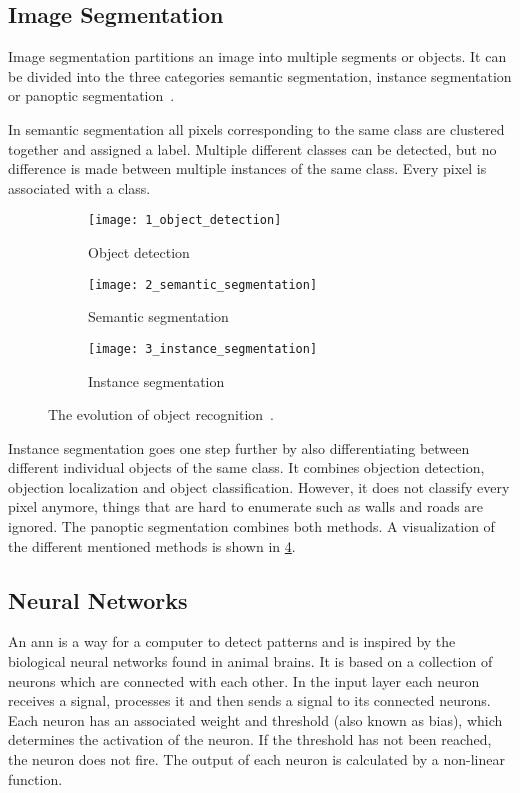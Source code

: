 \subsection{Image Segmentation}
Image segmentation partitions an image into multiple segments or objects.
It can be divided into the three categories semantic segmentation, instance segmentation or panoptic segmentation~\cite{Minaee2021}.\par
In semantic segmentation all pixels corresponding to the same class are clustered together and assigned a label.
Multiple different classes can be detected, but no difference is made between multiple instances of the same class.
Every pixel is associated with a class.\par
\begin{figure}[htb]
    \centering
    \begin{subfigure}{0.3\textwidth}
        \centering
        \texttt{[image: 1\_object\_detection]}
        \caption{Object detection}
        \label{fig:object_detection}
    \end{subfigure}
    \begin{subfigure}{0.3\textwidth}
        \centering
        \texttt{[image: 2\_semantic\_segmentation]}
        \caption{Semantic segmentation}
        \label{fig:semantic_segmentation}
    \end{subfigure}
    \begin{subfigure}{0.3\textwidth}
        \centering
        \texttt{[image: 3\_instance\_segmentation]}
        \caption{Instance segmentation}
        \label{fig:instance_segmentation}
    \end{subfigure}
    \caption[Evolution of object recognition]{The evolution of object recognition~\cite{Garcia2017}.}
    \label{fig:object_recognition}
\end{figure}
Instance segmentation goes one step further by also differentiating between different individual objects of the same class.
It combines objection detection, objection localization and object classification.
However, it does not classify every pixel anymore, things that are hard to enumerate such as walls and roads are ignored.
The panoptic segmentation combines both methods.
A visualization of the different mentioned methods is shown in \cref{fig:object_recognition}.



\subsection{Neural Networks}
An \gls{ann} is a way for a computer to detect patterns and is inspired by the biological neural networks found in animal brains.
It is based on a collection of neurons which are connected with each other.
In the input layer each neuron receives a signal, processes it and then sends a signal to its connected neurons.
Each neuron has an associated weight and threshold (also known as bias), which determines the activation of the neuron.
If the threshold has not been reached, the neuron does not fire.
The output of each neuron is calculated by a non-linear function.

